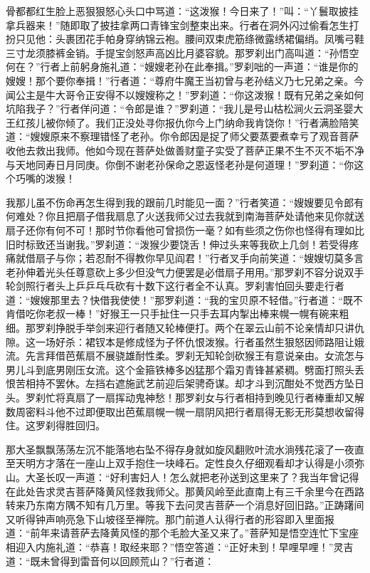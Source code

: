 \documentclass[12pt,UTF8]{ctexbook}
\begin{document}
骨都都红生脸上恶狠狠怒心头口中骂道：“这泼猴！今日来了！”叫：“丫鬟取披挂拿兵器来！”随即取了披挂拿两口青锋宝剑整束出来。行者在洞外闪过偷看怎生打扮只见他：头裹团花手帕身穿纳锦云袍。腰间双束虎筋绦微露绣裙偏绡。凤嘴弓鞋三寸龙须膝裤金销。手提宝剑怒声高凶比月婆容貌。那罗刹出门高叫道：“孙悟空何在？”行者上前躬身施礼道：“嫂嫂老孙在此奉揖。”罗刹咄的一声道：“谁是你的嫂嫂！那个要你奉揖！”行者道：“尊府牛魔王当初曾与老孙结义乃七兄弟之亲。今闻公主是牛大哥令正安得不以嫂嫂称之！”罗刹道：“你这泼猴！既有兄弟之亲如何坑陷我子？”行者佯问道：“令郎是谁？”罗刹道：“我儿是号山枯松涧火云洞圣婴大王红孩儿被你倾了。我们正没处寻你报仇你今上门纳命我肯饶你！”行者满脸陪笑道：“嫂嫂原来不察理错怪了老孙。你令郎因是捉了师父要蒸要煮幸亏了观音菩萨收他去救出我师。他如今现在菩萨处做善财童子实受了菩萨正果不生不灭不垢不净与天地同寿日月同庚。你倒不谢老孙保命之恩返怪老孙是何道理！”罗刹道：“你这个巧嘴的泼猴！

我那儿虽不伤命再怎生得到我的跟前几时能见一面？”行者笑道：“嫂嫂要见令郎有何难处？你且把扇子借我扇息了火送我师父过去我就到南海菩萨处请他来见你就送扇子还你有何不可！那时节你看他可曾损伤一毫？如有些须之伤你也怪得有理如比旧时标致还当谢我。”罗刹道：“泼猴少要饶舌！伸过头来等我砍上几剑！若受得疼痛就借扇子与你；若忍耐不得教你早见阎君！”行者叉手向前笑道：“嫂嫂切莫多言老孙伸着光头任尊意砍上多少但没气力便罢是必借扇子用用。”那罗刹不容分说双手轮剑照行者头上乒乒乓乓砍有十数下这行者全不认真。罗刹害怕回头要走行者道：“嫂嫂那里去？快借我使使！”那罗刹道：“我的宝贝原不轻借。”行者道：“既不肯借吃你老叔一棒！”好猴王一只手扯住一只手去耳内掣出棒来幌一幌有碗来粗细。那罗刹挣脱手举剑来迎行者随又轮棒便打。两个在翠云山前不论亲情却只讲仇隙。这一场好杀：裙钗本是修成怪为子怀仇恨泼猴。行者虽然生狠怒因师路阻让娥流。先言拜借芭蕉扇不展骁雄耐性柔。罗刹无知轮剑砍猴王有意说亲由。女流怎与男儿斗到底男刚压女流。这个金箍铁棒多凶猛那个霜刃青锋甚紧稠。劈面打照头丢恨苦相持不罢休。左挡右遮施武艺前迎后架骋奇谋。却才斗到沉酣处不觉西方坠日头。罗刹忙将真扇了一扇挥动鬼神愁！那罗刹女与行者相持到晚见行者棒重却又解数周密料斗他不过即便取出芭蕉扇幌一幌一扇阴风把行者扇得无影无形莫想收留得住。这罗刹得胜回归。

那大圣飘飘荡荡左沉不能落地右坠不得存身就如旋风翻败叶流水淌残花滚了一夜直至天明方才落在一座山上双手抱住一块峰石。定性良久仔细观看却才认得是小须弥山。大圣长叹一声道：“好利害妇人！怎么就把老孙送到这里来了？我当年曾记得在此处告求灵吉菩萨降黄风怪救我师父。那黄风岭至此直南上有三千余里今在西路转来乃东南方隅不知有几万里。等我下去问灵吉菩萨一个消息好回旧路。”正踌躇间又听得钟声响亮急下山坡径至禅院。那门前道人认得行者的形容即入里面报道：“前年来请菩萨去降黄风怪的那个毛脸大圣又来了。”菩萨知是悟空连忙下宝座相迎入内施礼道：“恭喜！取经来耶？”悟空答道：“正好未到！早哩早哩！”灵吉道：“既未曾得到雷音何以回顾荒山？”行者道：
\end{document}
